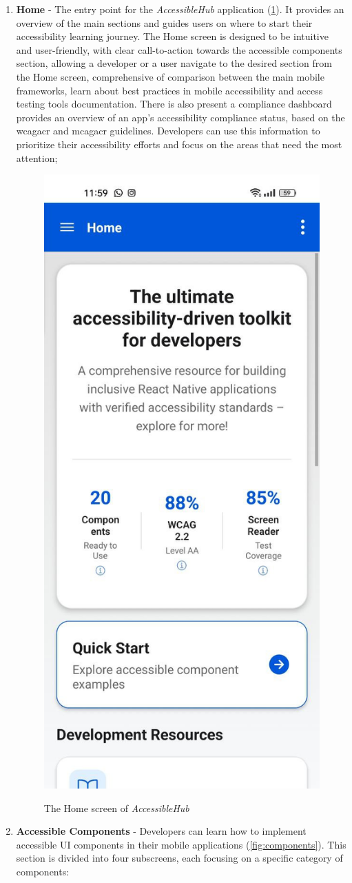 \begin{enumerate}
    \item \textbf{Home} - The entry point for the \textit{AccessibleHub} application (\ref{fig:homescreen}). It provides an overview of the main sections and guides users on where to start their accessibility learning journey. The Home screen is designed to be intuitive and user-friendly, with clear call-to-action towards the accessible components section, allowing a developer or a user navigate to the desired section from the Home screen, comprehensive of comparison between the main mobile frameworks, learn about best practices in mobile accessibility and access testing tools documentation. There is also present a compliance dashboard provides an overview of an app's accessibility compliance status, based on the \acrshort{wcagacr} and \acrshort{mcagacr} guidelines. Developers can use this information to prioritize their accessibility efforts and focus on the areas that need the most attention;

    \begin{figure}[ht]
    \centering
    \includegraphics[width=0.4\linewidth, alt={Screenshot of the Home screen of AccessibleHub}]{img/homescreen.jpg}
    \caption{The Home screen of \textit{AccessibleHub}}\label{fig:homescreen}
    \end{figure}

\pagebreak

    \item \textbf{Accessible Components} - Developers can learn how to implement accessible UI components in their mobile applications (\ref{fig:components}). This section is divided into four subscreens, each focusing on a specific category of components:


\end{enumerate}
